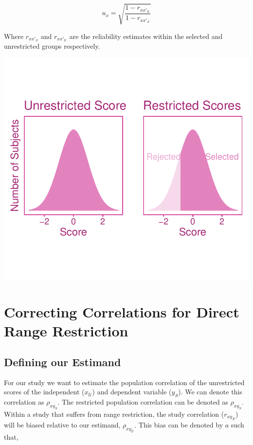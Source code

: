 \documentclass[
  letterpaper,
  DIV=11,
  numbers=noendperiod]{scrreprt}
\begin{document}
\[
u_x = \sqrt{\frac{1-r_{xx'_{\mathcal{U}}}}{1-r_{xx'_{\mathcal{S}}}}}
\]

Where \(r_{xx'_{\mathcal{S}}}\) and \(r_{xx'_{\mathcal{U}}}\) are the
reliability estimates within the selected and unrestricted groups
respectively.

\includegraphics{direct_range_restriction_files/figure-pdf/unnamed-chunk-1-1.pdf}

\hypertarget{correcting-correlations-for-direct-range-restriction}{%
\section{Correcting Correlations for Direct Range
Restriction}\label{correcting-correlations-for-direct-range-restriction}}

\hypertarget{defining-our-estimand-2}{%
\subsection{Defining our Estimand}\label{defining-our-estimand-2}}

For our study we want to estimate the population correlation of the
unrestricted scores of the independent (\(x_\mathcal{U}\)) and dependent
variable (\(y_S\)). We can denote this correlation as \(\rho_{xy_S}\).
The restricted population correlation can be denoted as \(\rho_{xy_S}\).
Within a study that suffers from range restriction, the study
correlation (\(r_{xy_{\mathcal{R}}}\)) will be biased relative to our
estimand, \(\rho_{xy_{\mathcal{U}}}\). This bias can be denoted by \(a\)
such that,
\end{document}

